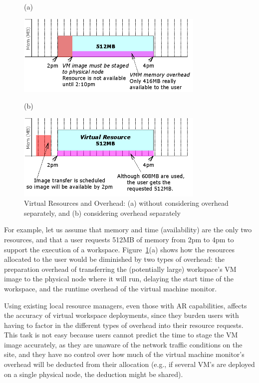 \begin{figure}
  \begin{center}
(a)

    \includegraphics[width=0.8\textwidth]{figures/virtualresources_a.png}

\vspace{3em}
(b)

    \includegraphics[width=0.8\textwidth]{figures/virtualresources_b.png}



    \caption{Virtual Resources and Overhead: (a) without considering overhead separately, and (b) considering overhead separately}
	\label{fig:virtualresources}
  \end{center}
\end{figure}

For example, let us assume that memory and time (availability) are the only two resources, and that a user requests 512MB of memory from 2pm to 4pm to support the execution of a workspace. Figure~\ref{fig:virtualresources}(a) shows how the resources allocated to the user would be diminished by two types of overhead: the preparation overhead of transferring the (potentially large) workspace's VM image to the physical node where it will run, delaying the start time of the workspace, and the runtime overhead of the virtual machine monitor. 

Using existing local resource managers, even those with AR capabilities, affects the accuracy of virtual workspace deployments, since they burden users with having to factor in the different types of overhead into their resource requests. This task is not easy because users cannot  predict the time to stage the VM image accurately, as they are unaware of the network traffic conditions on the site, and they have no control over how much of the virtual machine monitor's overhead will be deducted from their allocation (e.g., if several VM's are deployed on a single physical node, the deduction might be shared).


